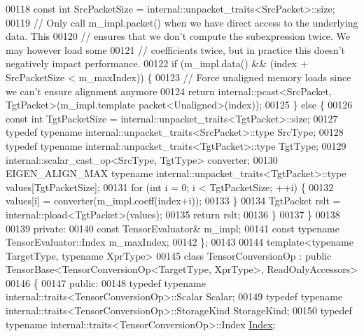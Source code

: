 \begin{DoxyCode}
00118     \textcolor{keyword}{const} \textcolor{keywordtype}{int} SrcPacketSize = internal::unpacket\_traits<SrcPacket>::size;
00119     \textcolor{comment}{// Only call m\_impl.packet() when we have direct access to the underlying data. This}
00120     \textcolor{comment}{// ensures that we don't compute the subexpression twice. We may however load some}
00121     \textcolor{comment}{// coefficients twice, but in practice this doesn't negatively impact performance.}
00122     \textcolor{keywordflow}{if} (m\_impl.data() && (index + SrcPacketSize < m\_maxIndex)) \{
00123       \textcolor{comment}{// Force unaligned memory loads since we can't ensure alignment anymore}
00124       \textcolor{keywordflow}{return} internal::pcast<SrcPacket, TgtPacket>(m\_impl.template packet<Unaligned>(index));
00125     \} \textcolor{keywordflow}{else} \{
00126       \textcolor{keyword}{const} \textcolor{keywordtype}{int} TgtPacketSize = internal::unpacket\_traits<TgtPacket>::size;
00127       \textcolor{keyword}{typedef} \textcolor{keyword}{typename} internal::unpacket\_traits<SrcPacket>::type SrcType;
00128       \textcolor{keyword}{typedef} \textcolor{keyword}{typename} internal::unpacket\_traits<TgtPacket>::type TgtType;
00129       internal::scalar\_cast\_op<SrcType, TgtType> converter;
00130       EIGEN\_ALIGN\_MAX \textcolor{keyword}{typename} internal::unpacket\_traits<TgtPacket>::type values[TgtPacketSize];
00131       \textcolor{keywordflow}{for} (\textcolor{keywordtype}{int} i = 0; i < TgtPacketSize; ++i) \{
00132         values[i] = converter(m\_impl.coeff(index+i));
00133       \}
00134       TgtPacket rslt = internal::pload<TgtPacket>(values);
00135       \textcolor{keywordflow}{return} rslt;
00136     \}
00137   \}
00138 
00139  \textcolor{keyword}{private}:
00140   \textcolor{keyword}{const} TensorEvaluator& m\_impl;
00141   \textcolor{keyword}{const} \textcolor{keyword}{typename} TensorEvaluator::Index m\_maxIndex;
00142 \};
00143 
00144 \textcolor{keyword}{template}<\textcolor{keyword}{typename} TargetType, \textcolor{keyword}{typename} XprType>
00145 \textcolor{keyword}{class }TensorConversionOp : \textcolor{keyword}{public} TensorBase<TensorConversionOp<TargetType, XprType>, ReadOnlyAccessors>
00146 \{
00147   \textcolor{keyword}{public}:
00148     \textcolor{keyword}{typedef} \textcolor{keyword}{typename} internal::traits<TensorConversionOp>::Scalar Scalar;
00149     \textcolor{keyword}{typedef} \textcolor{keyword}{typename} internal::traits<TensorConversionOp>::StorageKind StorageKind;
00150     \textcolor{keyword}{typedef} \textcolor{keyword}{typename} internal::traits<TensorConversionOp>::Index \hyperlink{namespace_eigen_a62e77e0933482dafde8fe197d9a2cfde}{Index};

\end{DoxyCode}
